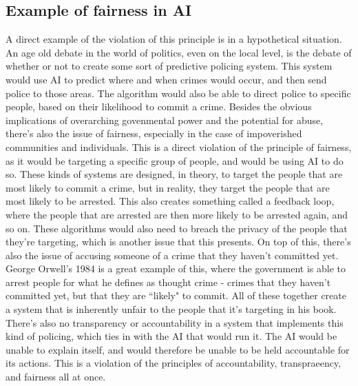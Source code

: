 \documentclass[12pt]{article}
\begin{document}
    \subsection{Example of fairness in AI}
    A direct example of the violation of this principle is in a hypothetical situation. An age old
    debate in the world of politics, even on the local level, is the debate of whether or not to
    create some sort of predictive policing system. This system would use AI to predict where and
    when crimes would occur, and then send police to those areas. The algorithm would also be able
    to direct police to specific people, based on their likelihood to commit a crime. Besides the 
    obvious implications of overarching govenmental power and the potential for abuse, there's also
    the issue of fairness, especially in the case of impoverished communities and individuals. This
    is a direct violation of the principle of fairness, as it would be targeting a specific group
    of people, and would be using AI to do so. These kinds of systems are designed, in theory, to
    target the people that are most likely to commit a crime, but in reality, they target the people
    that are most likely to be arrested. This also creates something called a feedback loop, where 
    the people that are arrested are then more likely to be arrested again, and so on. These algorithms
    would also need to breach the privacy of the people that they're targeting, which is another
    issue that this presents. On top of this, there's also the issue of accusing someone of a crime
    that they haven't committed yet. George Orwell's 1984 is a great example of this, where the
    government is able to arrest people for what he defines as thought crime - crimes that they haven't committed
    yet, but that they are ``likely" to commit. All of these together create a system that is inherently unfair
    to the people that it's targeting in his book. There's also no transparency or accountability
    in a system that implements this kind of policing, which ties in with the AI that would run it.
    The AI would be unable to explain itself, and would therefore be unable to be held accountable
    for its actions. This is a violation of the principles of accountability, transpraeency, and
    fairness all at once.
\end{document}
